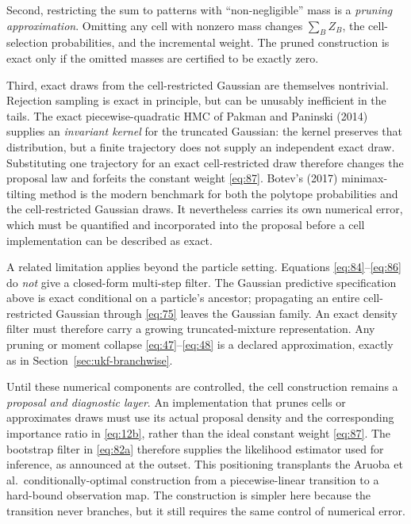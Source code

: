 \documentclass[11pt]{article}
\begin{document}
Second, restricting the sum to patterns with ``non-negligible'' mass is a \emph{pruning approximation}. Omitting any cell with nonzero mass changes \(\sum_B Z_B\), the cell-selection probabilities, and the incremental weight. The pruned construction is exact only if the omitted masses are certified to be exactly zero.

Third, exact draws from the cell-restricted Gaussian are themselves nontrivial. Rejection sampling is exact in principle, but can be unusably inefficient in the tails. The exact piecewise-quadratic HMC of Pakman and Paninski (2014) supplies an \emph{invariant kernel} for the truncated Gaussian: the kernel preserves that distribution, but a finite trajectory does not supply an independent exact draw. Substituting one trajectory for an exact cell-restricted draw therefore changes the proposal law and forfeits the constant weight \eqref{eq:87}. Botev's (2017) minimax-tilting method is the modern benchmark for both the polytope probabilities and the cell-restricted Gaussian draws. It nevertheless carries its own numerical error, which must be quantified and incorporated into the proposal before a cell implementation can be described as exact.

A related limitation applies beyond the particle setting. Equations \eqref{eq:84}--\eqref{eq:86} do \emph{not} give a closed-form multi-step filter. The Gaussian predictive specification above is exact conditional on a particle's ancestor; propagating an entire cell-restricted Gaussian through \eqref{eq:75} leaves the Gaussian family. An exact density filter must therefore carry a growing truncated-mixture representation. Any pruning or moment collapse \eqref{eq:47}--\eqref{eq:48} is a declared approximation, exactly as in Section~\ref{sec:ukf-branchwise}.

Until these numerical components are controlled, the cell construction remains a \emph{proposal
and diagnostic layer}. An implementation that prunes cells or approximates draws must use its actual proposal density and the corresponding importance ratio in \eqref{eq:12b}, rather than the ideal constant weight \eqref{eq:87}. The bootstrap filter in \eqref{eq:82a} therefore supplies the likelihood estimator used for inference, as announced at the outset. This positioning transplants the Aruoba et al.\ conditionally-optimal construction from a piecewise-linear transition to a hard-bound observation map. The construction is simpler here because the transition never branches, but it still requires the same control of numerical error.
\end{document}
